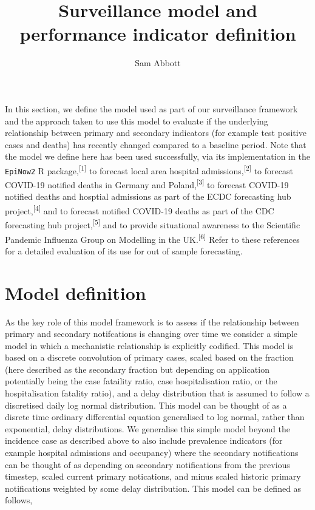 \documentclass[
]{article}
\title{Surveillance model and performance indicator definition}
\author{Sam Abbott}
\date{}
\begin{document}
\maketitle

In this section, we define the model used as part of our surveillance
framework and the approach taken to use this model to evaluate if the
underlying relationship between primary and secondary indicators (for
example test positive cases and deaths) has recently changed compared to
a baseline period. Note that the model we define here has been used
successfully, via its implementation in the \texttt{EpiNow2} R
package,\textsuperscript{{[}1{]}} to forecast local area hospital
admissions,\textsuperscript{{[}2{]}} to forecast COVID-19 notified
deaths in Germany and Poland,\textsuperscript{{[}3{]}} to forecast
COVID-19 notified deaths and hosptial admissions as part of the ECDC
forecasting hub project,\textsuperscript{{[}4{]}} and to forecast
notified COVID-19 deaths as part of the CDC forecasting hub
project,\textsuperscript{{[}5{]}} and to provide situational awareness
to the Scientific Pandemic Influenza Group on Modelling in the
UK.\textsuperscript{{[}6{]}} Refer to these references for a detailed
evaluation of its use for out of sample forecasting.

\hypertarget{model-definition}{%
\section{Model definition}\label{model-definition}}

As the key role of this model framework is to assess if the relationship
between primary and secondary notifcations is changing over time we
consider a simple model in which a mechanistic relationship is
explicitly codified. This model is based on a discrete convolution of
primary cases, scaled based on the fraction (here described as the
secondary fraction but depending on application potentially being the
case fataility ratio, case hospitalisation ratio, or the hospitalisation
fatality ratio), and a delay distribution that is assumed to follow a
discretised daily log normal distribution. This model can be thought of
as a disrete time ordinary differential equation generalised to log
normal, rather than exponential, delay distributions. We generalise this
simple model beyond the incidence case as described above to also
include prevalence indicators (for example hospital admissions and
occupancy) where the secondary notifications can be thought of as
depending on secondary notifications from the previous timestep, scaled
current primary notications, and minus scaled historic primary
notifications weighted by some delay distribution. This model can be
defined as follows,
\end{document}
